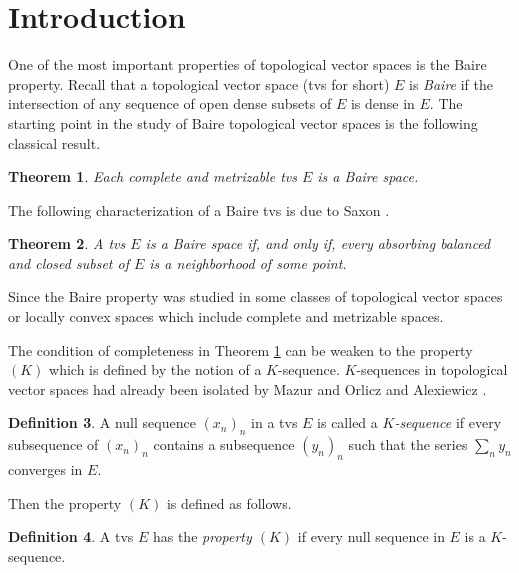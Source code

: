 \documentclass[preprint,11pt]{elsarticle}
\newtheorem{theorem}{Theorem}[section]
\theoremstyle{definition}
\newtheorem{definition}[theorem]{Definition}
\theoremstyle{remark}
\numberwithin{equation}{section}
\numberwithin{theorem}{section}
\begin{document}

\section{Introduction}


One of the most important properties of topological vector spaces is the Baire property. Recall that a topological vector space (tvs for short) $E$ is {\em Baire} if the intersection of any sequence of open dense subsets of $E$ is dense in $E$. The starting point in the study of Baire topological vector spaces is the following classical result.

\begin{theorem} \label{t:cm-Baire}
Each complete and metrizable tvs $E$ is a Baire space.
\end{theorem}

The following characterization of a Baire tvs is due to Saxon \cite[Theorem~1]{Saxon}.

\begin{theorem} \label{t:Saxon}
A tvs $E$ is a Baire space if, and only if, every absorbing balanced and closed subset of $E$ is a neighborhood of some point.
\end{theorem}

Since the Baire property was studied in some classes of topological vector spaces or locally convex spaces which include complete and metrizable spaces.

The condition of completeness in Theorem \ref{t:cm-Baire} can be weaken to the property $(K)$ which is defined by the notion of a $K$-sequence. $K$-sequences in topological vector spaces had already been isolated by Mazur and Orlicz \cite{MazOr} and Alexiewicz \cite{Alex-50}.

\begin{definition}\label{def:ks}
A null sequence $(x_n)_n$ in a tvs $E$ is called a {\em $K$-sequence}  if every subsequence of $(x_n)_n$ contains a subsequence $(y_n)_n$ such that the series $\sum_n y_n$ converges in $E$.
\end{definition}

Then the property $(K)$ is defined as follows.

\begin{definition} \label{def:property-(K)}
A tvs $E$ has the {\em property $(K)$} if every null sequence in $E$ is a $K$-sequence.
\end{definition}
\end{document}
